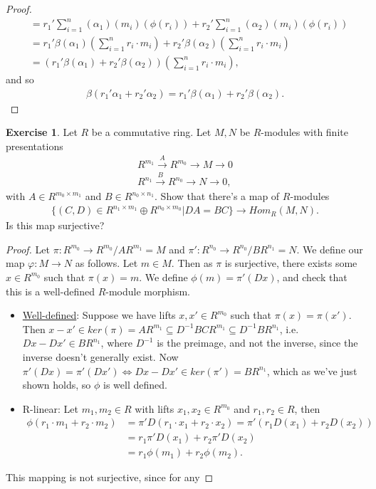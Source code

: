 \documentclass[12pt]{extarticle}
\newcommand{\set}[1]{\{#1\}}
\newcommand{\<}{\langle}
\renewcommand{\>}{\rangle}
\theoremstyle{definition}
\newtheorem{exercise}{Exercise}
\begin{document}
\begin{proof}
\begin{align*}
    &= r_1'\sum\limits_{i=1}^n (\alpha_1)(m_i)(\phi(r_i)) + r_2'\sum\limits_{i=1}^n (\alpha_2)(m_i)(\phi(r_i)) \\
    &= r_1' \beta(\alpha_1)(\sum\limits_{i=1}^n r_i \cdot m_i) + r_2'\beta(\alpha_2)(\sum\limits_{i=1}^n r_i \cdot m_i)   \\
    &= (r_1' \beta(\alpha_1) + r_2'\beta(\alpha_2))(\sum\limits_{i=1}^n r_i \cdot m_i),
  \end{align*}
  and so
  \begin{align*}
    \beta(r_1'\alpha_1 + r_2' \alpha_2) = r_1' \beta(\alpha_1) + r_2'\beta(\alpha_2).
  \end{align*}
\end{proof}
\begin{exercise}
  Let $R$ be a commutative ring. Let $M, N$ be $R$-modules with finite presentations
  \begin{align*}
    R^{m_1} \overset{A} \longrightarrow R^{m_0} \longrightarrow M \longrightarrow 0  \\
    R^{n_1} \overset{B} \longrightarrow R^{n_0} \longrightarrow N \longrightarrow 0,
  \end{align*}
  with $A \in R^{m_0 \times m_1}$ and $B \in R^{n_0 \times n_1}$. Show that there's a map of $R$-modules
  \begin{align*}
    \set{(C,D) \in R^{n_1 \times m_1} \oplus R^{n_0 \times m_0} | DA=BC} \to Hom_R(M,N).
  \end{align*}
  Is this map surjective? 
\end{exercise}
\begin{proof}
  Let $\pi: R^{m_0} \to R^{m_0}/AR^{m_1} = M$ and $\pi': R^{n_0} \to R^{n_0}/BR^{n_1} = N$. We define our map $\varphi: M \to N$ as follows. Let $m \in M$.
  Then as $\pi$ is surjective, there exists some $x \in R^{m_0}$ such that $\pi(x) = m $. We define $\phi(m) = \pi'(Dx)$, and check that this is
  a well-defined $R$-module morphism.
  \begin{itemize}
  \item
    \underline{Well-defined}: Suppose we have lifts $x, x' \in R^{m_0}$ such that $\pi(x) = \pi(x')$. Then $x-x' \in ker(\pi)=AR^{m_1} \subseteq D^{-1}BCR^{m_1} \subseteq D^{-1} B R^{n_1}$, i.e. $Dx-Dx' \in BR^{n_1}$, where $D^{-1}$ is the preimage, and not the inverse, since the inverse doesn't generally exist.
    Now $ \pi'(Dx) = \pi'(Dx') \iff Dx - Dx' \in ker(\pi') = BR^{n_1}$, which as we've just shown holds, so $\phi$ is well defined.
  \item{R-linear}: Let $m_1, m_2 \in R$ with lifts $x_1, x_2 \in R^{m_0}$ and $r_1, r_2 \in R$, then
    \begin{align*}
      \phi(r_1 \cdot m_1 + r_2 \cdot m_2) &= \pi'D(r_1 \cdot x_1 + r_2 \cdot x_2) = \pi'(r_1D(x_1) + r_2D(x_2)) \\
      &= r_1 \pi'D(x_1) + r_2 \pi'D(x_2)  \\
      &= r_1 \phi(m_1) + r_2 \phi(m_2).
    \end{align*}
  \end{itemize}
  This mapping is not surjective, since for any
\end{proof}
\end{document}
